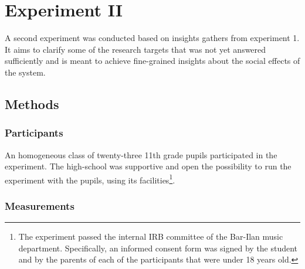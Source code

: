 \documentclass[a4paper,11pt]{article}
\begin{document}
{\section{Experiment II}

A second experiment was conducted based on insights gathers from experiment 1.
It aims to clarify some of the research targets that was not yet answered sufficiently and is meant to achieve fine-grained insights about the social effects of the system.

\subsection{Methods}\label{methods:evaluation}

\subsubsection{Participants}

An homogeneous class of twenty-three 11th grade pupils participated in the experiment.
The high-school was supportive and open the possibility to run the experiment with the pupils, using its facilities\footnote{The experiment passed the internal IRB committee of the Bar-Ilan music department. Specifically, an informed consent form was signed by the student and by the parents of each of the participants that were under 18 years old.}.

\subsubsection{Measurements}

}
\end{document}
